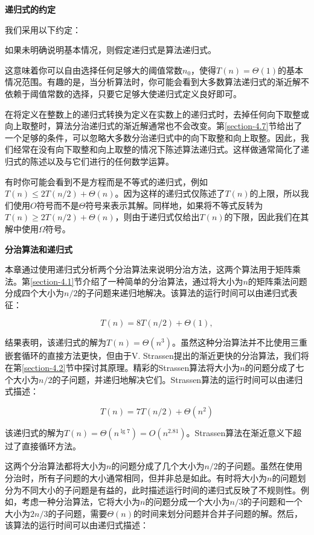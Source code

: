 \documentclass[lang=cn,newtx,10pt,scheme=chinese]{elegantbook}
\begin{document}
\textbf{递归式的约定}

我们采用以下约定：

\begin{tcolorbox}
如果未明确说明基本情况，则假定递归式是算法递归式。
\end{tcolorbox}

这意味着你可以自由选择任何足够大的阈值常数$n_0$，使得$T(n)=\Theta(1)$的基本情况范围。有趣的是，当分析算法时，你可能会看到大多数算法递归式的渐近解不依赖于阈值常数的选择，只要它足够大使递归式定义良好即可。

在将定义在整数上的递归式转换为定义在实数上的递归式时，去掉任何向下取整或向上取整时，算法分治递归式的渐近解通常也不会改变。第\ref{section-4.7}节给出了一个足够的条件，可以忽略大多数分治递归式中的向下取整和向上取整。因此，我们经常在没有向下取整和向上取整的情况下陈述算法递归式。这样做通常简化了递归式的陈述以及与它们进行的任何数学运算。

有时你可能会看到不是方程而是不等式的递归式，例如$T(n) \leq 2 T(n / 2)+\Theta(n)$。因为这样的递归式仅陈述了$T(n)$的上限，所以我们使用$O$符号而不是$\Theta$符号来表示其解。同样地，如果将不等式反转为$T(n)\geq 2T(n/2)+\Theta(n)$，则由于递归式仅给出$T(n)$的下限，因此我们在其解中使用$\Omega$符号。

\textbf{分治算法和递归式}

本章通过使用递归式分析两个分治算法来说明分治方法，这两个算法用于矩阵乘法。第\ref{section-4.1}节介绍了一种简单的分治算法，通过将大小为$n$的矩阵乘法问题分成四个大小为$n/2$的子问题来递归地解决。该算法的运行时间可以由递归式表征：

$$
T(n)=8 T(n / 2)+\Theta(1),
$$

结果表明，该递归式的解为$T(n)=\Theta\left(n^3\right)$。虽然这种分治算法并不比使用三重嵌套循环的直接方法更快，但由于V. Strassen提出的渐近更快的分治算法，我们将在第\ref{section-4.2}节中探讨其原理。精彩的Strassen算法将大小为$n$的问题分成了七个大小为$n/2$的子问题，并递归地解决它们。Strassen算法的运行时间可以由递归式描述：

$$
T(n)=7 T(n / 2)+\Theta(n^2)
$$

该递归式的解为$T(n)=\Theta\left(n^{\lg 7}\right)=O\left(n^{2.81}\right)$。Strassen算法在渐近意义下超过了直接循环方法。

这两个分治算法都将大小为$n$的问题分成了几个大小为$n/2$的子问题。虽然在使用分治时，所有子问题的大小通常相同，但并非总是如此。有时将大小为$n$的问题划分为不同大小的子问题是有益的，此时描述运行时间的递归式反映了不规则性。例如，考虑一种分治算法，它将大小为$n$的问题分成一个大小为$n/3$的子问题和一个大小为$2n/3$的子问题，需要$\Theta(n)$的时间来划分问题并合并子问题的解。然后，该算法的运行时间可以由递归式描述：
\end{document}
